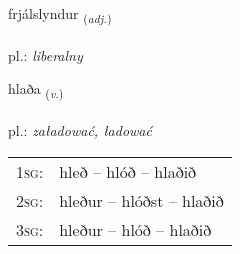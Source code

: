\documentclass[frontgrid, backgrid]{flacards}\usepackage[]{graphicx}\usepackage[]{xcolor}
\begin{document}
\renewcommand{\flhead}{\vskip5pt \fboxsep=0pt {\small\bfseries\footnotesize Lýsingarorð | przymiotnik}}
\renewcommand{\fcfoot}{\vskip5pt \fboxsep=0pt \hspace{2pt}{\small\bfseries\footnotesize 3K}}

\renewcommand{\blhead}{\vskip5pt {\small\bfseries\footnotesize Lýsingarorð | przymiotnik }}
\renewcommand{\bcfoot}{\vskip5pt \hspace{2pt}{\small\bfseries\footnotesize 3K}}


{frjálslyndur \small{\textsubscript{(\textit{adj.})}} \\[1ex] %
\textphonetic{[frjaulstlɪntʏr]} \\
pl.: \emph{liberalny} \\  [2ex]
\renewcommand*{\arraystretch}{0.8}
}

\renewcommand{\flhead}{\vskip5pt \fboxsep=0pt {\small\bfseries\footnotesize Sagnorð | czasownik}}
\renewcommand{\fcfoot}{\vskip5pt \fboxsep=0pt \hspace{2pt}{\small\bfseries\footnotesize 3K}}

\renewcommand{\blhead}{\vskip5pt {\small\bfseries\footnotesize Sagnorð | czasownik }}
\renewcommand{\bcfoot}{\vskip5pt \hspace{2pt}{\small\bfseries\footnotesize 3K}}


{hlaða \small{\textsubscript{(\textit{v.})}} \\[1ex] %
\textphonetic{[l̥aːða]} \\
pl.: \emph{załadować, ładować} \\  [2ex]
\renewcommand*{\arraystretch}{0.8}
\begin{tabular}{p{1cm}l}
\textsc{1sg}: & hleð -- hlóð -- hlaðið \\ 
\textsc{2sg}: & hleður -- hlóðst -- hlaðið \\ 
\textsc{3sg}: & hleður -- hlóð -- hlaðið \\ 
\end{tabular}
}
\end{document}
